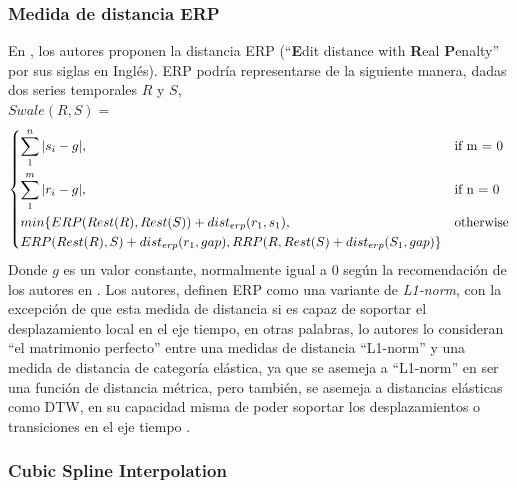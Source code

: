 \subsubsection{\textbf{Medida de distancia ERP}}
En \cite{erp}, los autores proponen la distancia ERP (\enquote{\textbf{E}dit distance with \textbf{R}eal \textbf{P}enalty} por sus siglas en Ingl\'es). ERP podr\'ia representarse de la siguiente manera, dadas dos series temporales $R$ y $S$,\\
$Swale(R, S) =$
\[
\begin{dcases}
    \sum\limits_{1}^{n}|s_i - g|,&   \text{if m = 0}\\
    \sum\limits_{1}^{m}|r_i - g|,&   \text{if n = 0}\\       
    {min\{ERP(Rest(R), Rest(S)) + dist_{erp}(r_1,s_1)}, & \text{otherwise}\\
    {ERP(Rest(R),S) + dist_{erp}(r_1,gap), RRP(R,Rest(S) + dist_{erp}(S_1,gap)}\} 
\end{dcases}
\]
Donde $g$ es un valor constante, normalmente igual a 0 seg\'un la recomendaci\'on de los autores en \cite{erp}. Los autores, definen ERP como una variante de \textit{L1-norm}, con la excepci\'on de que esta medida de distancia si es capaz de soportar el desplazamiento local en el eje tiempo, en otras palabras, lo autores lo consideran \enquote{el matrimonio perfecto} entre una medidas de distancia \enquote{L1-norm} y una medida de distancia de categor\'ia el\'astica, ya que se asemeja a \enquote{L1-norm} en ser una funci\'on de distancia m\'etrica, pero tambi\'en, se asemeja a distancias el\'asticas como DTW, en su capacidad misma de poder soportar los desplazamientos o transiciones en el eje tiempo \cite{erp}.
\subsubsection{\textbf{Cubic Spline Interpolation}}
